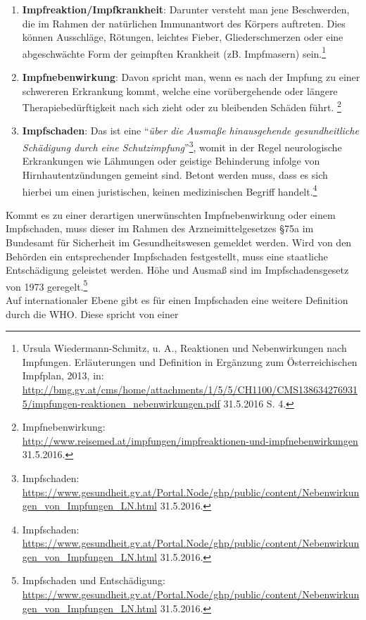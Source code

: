 \documentclass[
    a4paper,
    12pt,
    hyphens,
    chapterprefix=true,
    headheight=33pt,
    footheight=29pt,
    headings=optiontohead, %
]{scrartcl}
\begin{document}
\begin{enumerate}
  \item{\textbf{Impfreaktion/Impfkrankheit}: Darunter versteht man jene Beschwerden, die im Rahmen der natürlichen Immunantwort des Körpers auftreten. 
    Dies können Ausschläge, Rötungen, leichtes Fieber, Gliederschmerzen oder eine abgeschwächte Form der geimpften Krankheit 
    (zB. Impfmasern) sein.\footnote{Ursula Wiedermann-Schmitz, u. A., Reaktionen und Nebenwirkungen nach Impfungen. Erläuterungen und Definition in 
    Ergänzung zum Österreichischen Impfplan, 2013, in: \url{http://bmg.gv.at/cms/home/attachments/1/5/5/CH1100/CMS1386342769315/impfungen-reaktionen_nebenwirkungen.pdf} 31.5.2016 S. 4.}}
  \item{\textbf{Impfnebenwirkung}: Davon spricht man, wenn es nach der Impfung zu einer schwereren Erkrankung kommt, welche eine 
    vorübergehende oder längere Therapiebedürftigkeit nach sich zieht oder zu bleibenden Schäden führt.
    \footnote{Impfnebenwirkung:\\ \url{http://www.reisemed.at/impfungen/impfreaktionen-und-impfnebenwirkungen} 31.5.2016.}}
  \item{\textbf{Impfschaden}: Das ist eine "`\textit{über die Ausmaße hinausgehende gesundheitliche Schädigung durch eine 
    Schutzimpfung}"'\footnote{Impfschaden:\\ \url{https://www.gesundheit.gv.at/Portal.Node/ghp/public/content/Nebenwirkungen_von_Impfungen_LN.html} 31.5.2016.}, 
    womit in der Regel neurologische Erkrankungen wie Lähmungen oder geistige Behinderung infolge von Hirnhautentzündungen gemeint sind. Betont werden muss, dass es sich hierbei um einen juristischen, keinen medizinischen Begriff handelt.\footnote{Impfschaden:\\ \url{https://www.gesundheit.gv.at/Portal.Node/ghp/public/content/Nebenwirkungen_von_Impfungen_LN.html} 31.5.2016.}}
\end{enumerate}
Kommt es zu einer derartigen unerwünschten Impfnebenwirkung oder einem Impfschaden, muss dieser im Rahmen des Arzneimittelgesetzes 
§75a im Bundesamt für Sicherheit im Gesundheitswesen gemeldet werden. Wird von den Behörden ein 
entsprechender Impfschaden festgestellt, muss eine staatliche Entschädigung geleistet werden. 
Höhe und Ausmaß sind im Impfschadensgesetz von 1973 geregelt.\footnote{Impfschaden und Entschädigung: \url{https://www.gesundheit.gv.at/Portal.Node/ghp/public/content/Nebenwirkungen_von_Impfungen_LN.html} 31.5.2016.}\\
Auf internationaler Ebene gibt es für einen Impfschaden eine weitere Definition durch die WHO. Diese spricht von einer 
\end{document}
